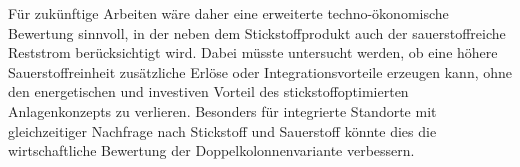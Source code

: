 Für zukünftige Arbeiten wäre daher eine erweiterte techno-ökonomische Bewertung sinnvoll, in der neben dem Stickstoffprodukt auch der sauerstoffreiche Reststrom berücksichtigt wird. Dabei müsste untersucht werden, ob eine höhere Sauerstoffreinheit zusätzliche Erlöse oder Integrationsvorteile erzeugen kann, ohne den energetischen und investiven Vorteil des stickstoffoptimierten Anlagenkonzepts zu verlieren. Besonders für integrierte Standorte mit gleichzeitiger Nachfrage nach Stickstoff und Sauerstoff könnte dies die wirtschaftliche Bewertung der Doppelkolonnenvariante verbessern.
